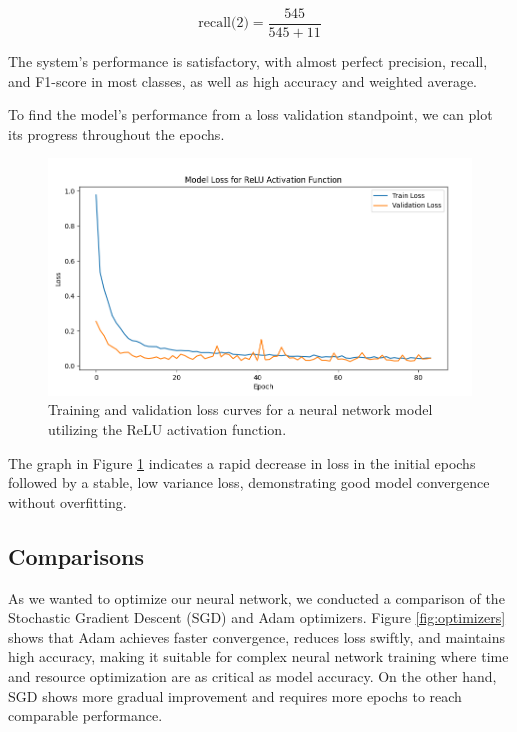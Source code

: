 \begin{equation}
	\text{recall(2)} = \frac{545}{545 + 11}
	\label{eq:recall2}
\end{equation}

The system's performance is satisfactory, with almost perfect precision, recall, and F1-score in most classes, as well as high accuracy and weighted average.

To find the model's performance from a loss validation standpoint, we can plot its progress throughout the epochs.



\begin{figure}[ht]
	\centering
	\includegraphics[width=\textwidth]{images/model_loss_relu.png}
	\caption{Training and validation loss curves for a neural network model utilizing the ReLU activation function.}
	\label{fig:model_loss_relu}
\end{figure}

The graph in Figure \ref{fig:model_loss_relu} indicates a rapid decrease in loss in the initial epochs followed by a stable, low variance loss, demonstrating good model convergence without overfitting.

\subsection{Comparisons}
As we wanted to optimize our neural network, we conducted a comparison of the Stochastic Gradient Descent (SGD) and Adam optimizers. Figure \ref{fig:optimizers} shows that Adam achieves faster convergence, reduces loss swiftly, and maintains high accuracy, making it suitable for complex neural network training where time and resource optimization are as critical as model accuracy. On the other hand, SGD shows more gradual improvement and requires more epochs to reach comparable performance.

